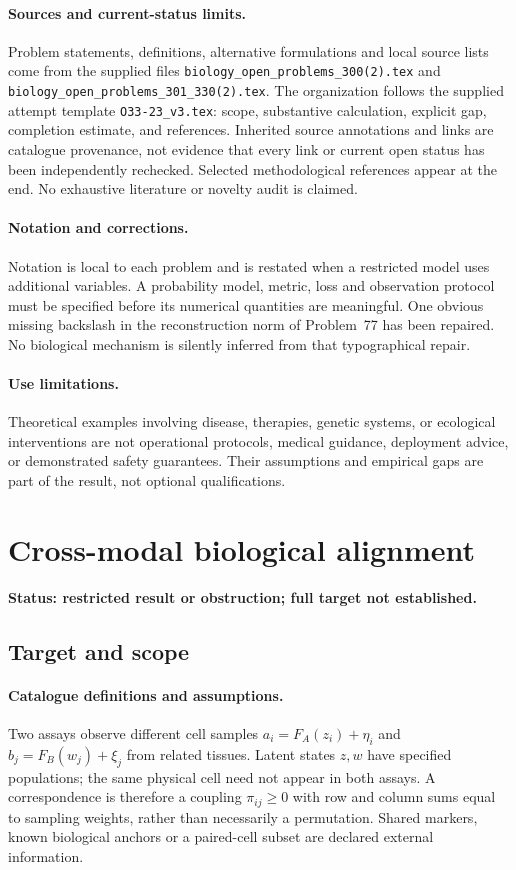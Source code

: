 \documentclass[11pt]{article}
\begin{document}
\paragraph{Sources and current-status limits.}
Problem statements, definitions, alternative formulations and local source lists
come from the supplied files
\texttt{biology\_open\_problems\_300(2).tex} and
\texttt{biology\_open\_problems\_301\_330(2).tex}.
The organization follows the supplied attempt template
\texttt{O33-23\_v3.tex}: scope, substantive calculation, explicit gap,
completion estimate, and references. Inherited source annotations and links are
catalogue provenance, not evidence that every link or current open status has
been independently rechecked. Selected methodological references appear at the
end. No exhaustive literature or novelty audit is claimed.

\paragraph{Notation and corrections.}
Notation is local to each problem and is restated when a restricted model uses
additional variables. A probability model, metric, loss and observation protocol
must be specified before its numerical quantities are meaningful. One obvious
missing backslash in the reconstruction norm of Problem~77 has been repaired.
No biological mechanism is silently inferred from that typographical repair.

\paragraph{Use limitations.}
Theoretical examples involving disease, therapies, genetic systems, or ecological
interventions are not operational protocols, medical guidance, deployment advice,
or demonstrated safety guarantees. Their assumptions and empirical gaps are part
of the result, not optional qualifications.


\section*{Cross-modal biological alignment}
\label{prob:078}
\noindent\textbf{Status: restricted result or obstruction; full target not established.}
\subsection{Target and scope}
\paragraph{Catalogue definitions and assumptions.}
Two assays observe different cell samples $a_i=F_A(z_i)+\eta_i$ and $b_j=F_B(w_j)+\xi_j$ from related tissues. Latent states $z,w$ have specified populations; the same physical cell need not appear in both assays. A correspondence is therefore a coupling $\pi_{ij}\ge0$ with row and column sums equal to sampling weights, rather than necessarily a permutation. Shared markers, known biological anchors or a paired-cell subset are declared external information.
\end{document}
